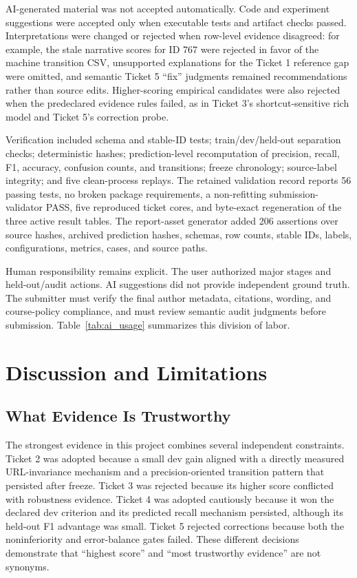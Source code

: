 \documentclass[conference]{IEEEtran}
\begin{document}
AI-generated material was not accepted automatically. Code and experiment suggestions were accepted only when executable tests and artifact checks passed. Interpretations were changed or rejected when row-level evidence disagreed: for example, the stale narrative scores for ID 767 were rejected in favor of the machine transition CSV, unsupported explanations for the Ticket 1 reference gap were omitted, and semantic Ticket 5 ``fix'' judgments remained recommendations rather than source edits. Higher-scoring empirical candidates were also rejected when the predeclared evidence rules failed, as in Ticket 3's shortcut-sensitive rich model and Ticket 5's correction probe.

Verification included schema and stable-ID tests; train/dev/held-out separation checks; deterministic hashes; prediction-level recomputation of precision, recall, F1, accuracy, confusion counts, and transitions; freeze chronology; source-label integrity; and five clean-process replays. The retained validation record reports 56 passing tests, no broken package requirements, a non-refitting submission-validator PASS, five reproduced ticket cores, and byte-exact regeneration of the three active result tables. The report-asset generator added 206 assertions over source hashes, archived prediction hashes, schemas, row counts, stable IDs, labels, configurations, metrics, cases, and source paths.

Human responsibility remains explicit. The user authorized major stages and held-out/audit actions. AI suggestions did not provide independent ground truth. The submitter must verify the final author metadata, citations, wording, and course-policy compliance, and must review semantic audit judgments before submission. Table~\ref{tab:ai_usage} summarizes this division of labor.



\section{Discussion and Limitations}

\subsection{What Evidence Is Trustworthy}

The strongest evidence in this project combines several independent constraints. Ticket 2 was adopted because a small dev gain aligned with a directly measured URL-invariance mechanism and a precision-oriented transition pattern that persisted after freeze. Ticket 3 was rejected because its higher score conflicted with robustness evidence. Ticket 4 was adopted cautiously because it won the declared dev criterion and its predicted recall mechanism persisted, although its held-out F1 advantage was small. Ticket 5 rejected corrections because both the noninferiority and error-balance gates failed. These different decisions demonstrate that ``highest score'' and ``most trustworthy evidence'' are not synonyms.
\end{document}
